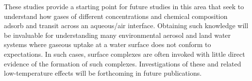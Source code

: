 These studies provide a starting point for future studies in this area that seek to understand how gases of different concentrations and chemical composition adsorb and transit across an aqueous/air interface. Obtaining such knowledge will be invaluable for understanding many environmental aerosol and land water systems where gaseous uptake at a water surface does not conform to expectations. In such cases, surface complexes are often invoked with little direct evidence of the formation of such complexes. Investigations of these and related low-temperature effects will be forthcoming in future publications.

